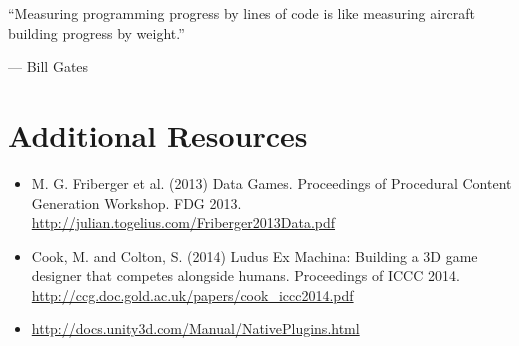 \documentclass{../fal_assignment}
\begin{document}
\begin{marginquote}
    ``Measuring programming progress by lines of code is like measuring aircraft building progress by weight.''
    
    --- Bill Gates
\end{marginquote}
\section*{Additional Resources}

\begin{itemize}
    \item M. G. Friberger et al. (2013) Data Games. Proceedings of Procedural Content Generation Workshop. FDG 2013.
        \url{http://julian.togelius.com/Friberger2013Data.pdf}
    \item Cook, M. and Colton, S. (2014) Ludus Ex Machina: Building a 3D game designer that competes alongside humans. Proceedings of ICCC 2014.
        \url{http://ccg.doc.gold.ac.uk/papers/cook_iccc2014.pdf}
    \item \url{http://docs.unity3d.com/Manual/NativePlugins.html}
\end{itemize}
\end{document}
